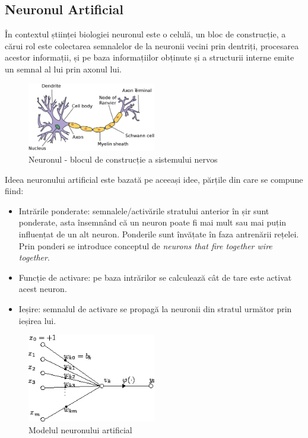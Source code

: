 \subsection{Neuronul Artificial}
În contextul științei biologiei neuronul este o celulă, un bloc de construcție, a cărui rol este colectarea semnalelor de la neuronii vecini prin dentriți, procesarea acestor informații, și pe baza informațiilor obținute și a structurii interne emite un semnal al lui prin axonul lui.\newline
\begin{figure}[h!]
    	\centering
	\captionsetup{justification=centering, margin=2cm}
	\includegraphics[width=0.5\textwidth]{figures/neuron.png}
	\caption{Neuronul - blocul de construcție a sistemului nervos \cite{neuron}}
	\label{fig:segmentare_semantica}
\end{figure}
Ideea neuronului artificial este bazată pe aceeași idee, părțile din care se compune fiind:
\begin{itemize}
	\item Intrările ponderate: semnalele/activările stratului anterior în șir sunt ponderate, asta însemnând că un neuron poate fi mai mult sau mai puțin influențat de un alt neuron. Ponderile sunt învățate în faza antrenării rețelei. Prin ponderi se introduce conceptul de \textit{neurons that fire together wire together}.
	\item Funcție de activare: pe baza intrărilor se calculează cât de tare este activat acest neuron.
	\item Ieșire: semnalul de activare se propagă la neuronii din stratul următor prin ieșirea lui.
\end{itemize}
\begin{figure}[h!]
    	\centering
	\captionsetup{justification=centering, margin=2cm}
	\includegraphics[width=0.5\textwidth]{figures/an.png}
	\caption{Modelul neuronului artificial \cite{arn}}
	\label{fig:neuronul_artificial}
\end{figure}

